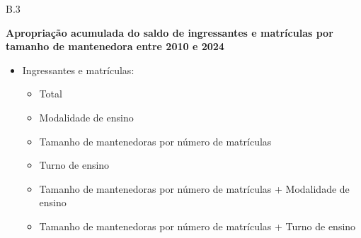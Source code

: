 \documentclass[
  12pt,
  ignorenonframetext,
  aspectratio=169,
  brazilian,
  t]{beamer}
\providecommand{\tightlist}{%
  \setlength{\itemsep}{0pt}\setlength{\parskip}{0pt}}
\renewcommand{\tightlist}{\setlength{\itemsep}{4pt}\setlength{\parskip}{0pt}\setlength{\parsep}{0pt}}
\newcommand{\DescricaoIndicador}[1]{%
  {\color{azul}\fontsize{17}{23}\selectfont\bfseries #1\par}\vspace{4mm}}
\newcommand{\Rotulo}[1]{%
  \par\addvspace{7pt}{\color{azul}\bfseries #1\par}\nobreak\vspace{2pt}}
\begin{document}
\begin{frame}{B.3}
\protect{}\label{b.3}
\DescricaoIndicador{Apropriação acumulada do saldo de ingressantes e matrículas por tamanho de mantenedora entre 2010 e 2024}

\Rotulo{Séries}

\begin{itemize}
\tightlist
\item
  Ingressantes e matrículas:

  \begin{itemize}
  \tightlist
  \item
    Total
  \item
    Modalidade de ensino
  \item
    Tamanho de mantenedoras por número de matrículas
  \item
    Turno de ensino
  \item
    Tamanho de mantenedoras por número de matrículas + Modalidade de
    ensino
  \item
    Tamanho de mantenedoras por número de matrículas + Turno de ensino
  \end{itemize}
\end{itemize}
\end{frame}
\end{document}
